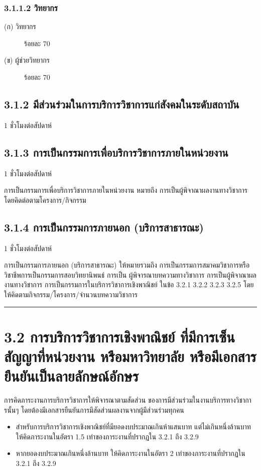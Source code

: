 \documentclass[a4paper,12pt,english]{sphinxmanual}
\begin{document}
\subsubsection{3.1.1.2 วิทยากร}
\label{\detokenize{3service:id8}}\begin{description}
\item[{(ก) วิทยากร}] \leavevmode
ร้อยละ 70

\item[{(ข) ผู้ช่วยวิทยากร}] \leavevmode
ร้อยละ 70

\end{description}


\subsection{3.1.2 มีส่วนร่วมในการบริการวิชาการแก่สังคมในระดับสถาบัน}
\label{\detokenize{3service:id9}}
1 ชั่วโมงต่อสัปดาห์


\subsection{3.1.3 การเป็นกรรมการเพื่อบริการวิชาการภายในหน่วยงาน}
\label{\detokenize{3service:id10}}
1 ชั่วโมงต่อสัปดาห์

การเป็นกรรมการเพื่อบริการวิชาการภายในหน่วยงาน หมายถึง การเป็นผู้พิจาณาผลงานทางวิชาการ โดยคิดต่อตามโครงการ/กิจกรรม


\subsection{3.1.4 การเป็นกรรมการภายนอก (บริการสาธารณะ)}
\label{\detokenize{3service:id11}}
1 ชั่วโมงต่อสัปดาห์

การเป็นกรรมการภายนอก (บริการสาธารณะ) ให้หมายรวมถึง การเป็นกรรมการสมาคมวิชาการหรือวิชาชีพการเป็นกรรมการสอบวิทยานิพนธ์ การเป็น
ผู้พิจารณาบทความทางวิชาการ การเป็นผู้พิจาณาผลงานทางวิชาการ การเป็นกรรมการในบริการวิชาการเชิงพาณิชย์ ในข้อ 3.2.1 3.2.2 3.2.3 3.2.5
โดยให้คิดตามกิจกรรม/โครงการ/จำนวนบทความวิชาการ


\bigskip\hrule\bigskip



\section{3.2 การบริการวิชาการเชิงพาณิชย์ ที่มีการเซ็นสัญญาที่หน่วยงาน หรือมหาวิทยาลัย หรือมีเอกสารยืนยันเป็นลายลักษณ์อักษร}
\label{\detokenize{3service:id12}}
การคิดภาระงานการบริการวิชาการให้พิจารณาตามสัดส่วน ของการมีส่วนร่วมในงานบริการทางวิชาการนั้นๆ โดยต้องมีเอกสารยืนยันการมีสัดส่วนผลงานจากผู้มีส่วนร่วมทุกคน
\begin{itemize}
\item {} 
สำหรับการบริการวิชาการเชิงพาณิชย์ที่มียอดงบประมาณเกินห้าแสนบาท แต่ไม่เกินหนึ่งล้านบาท ให้คิดภาระงานในอัตรา 1.5 เท่าของภาระงานที่ปรากฏใน 3.2.1 ถึง 3.2.9

\item {} 
หากยอดงบประมาณเกินหนึ่งล้านบาท ให้คิดภาระงานในอัตรา 2 เท่าของภาระงานที่ปรากฏใน 3.2.1 ถึง 3.2.9

\end{itemize}
\end{document}
